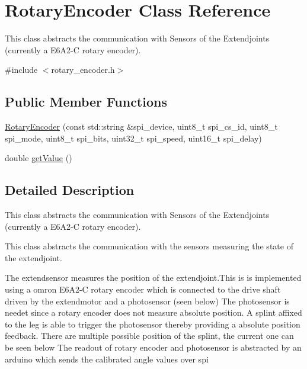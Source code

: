 \hypertarget{classRotaryEncoder}{}\section{Rotary\+Encoder Class Reference}
\label{classRotaryEncoder}


This class abstracts the communication with Sensors of the Extendjoints (currently a E6\+A2-\/C rotary encoder).  




{\ttfamily \#include $<$rotary\+\_\+encoder.\+h$>$}

\subsection*{Public Member Functions}
\begin{DoxyCompactItemize}
\item 
\hyperlink{classRotaryEncoder_ac57e2531f91e03b48bcc2b7e3f0edf62}{Rotary\+Encoder} (const std\+::string \&spi\+\_\+device, uint8\+\_\+t spi\+\_\+cs\+\_\+id, uint8\+\_\+t spi\+\_\+mode, uint8\+\_\+t spi\+\_\+bits, uint32\+\_\+t spi\+\_\+speed, uint16\+\_\+t spi\+\_\+delay)
\item 
double \hyperlink{classRotaryEncoder_adf89df36f38d0ee87b454f22c25a85f0}{get\+Value} ()
\end{DoxyCompactItemize}


\subsection{Detailed Description}
This class abstracts the communication with Sensors of the Extendjoints (currently a E6\+A2-\/C rotary encoder). 

This class abstracts the communication with the sensors measuring the state of the extendjoint.

The extendsensor measures the position of the extendjoint.\+This is is implemented using a omron E6\+A2-\/C rotary encoder which is connected to the drive shaft driven by the extendmotor and a photosensor (seen below)  The photosensor is needet since a rotary encoder does not measure absolute position. A splint affixed to the leg is able to trigger the photosensor thereby providing a absolute position feedback. There are multiple possible position of the splint, the current one can be seen below  The readout of rotary encoder and photosensor is abstracted by an arduino which sends the calibrated angle values over spi

